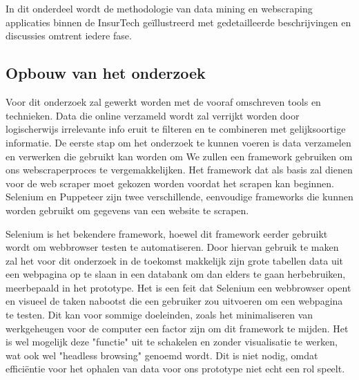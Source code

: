 
\chapter{}
\label{ch:methodologie}


In dit onderdeel wordt de methodologie van data mining en webscraping applicaties binnen de InsurTech geïllustreerd met gedetailleerde beschrijvingen en discussies omtrent iedere fase.

\section{Opbouw van het onderzoek}
Voor dit onderzoek zal gewerkt worden met de vooraf omschreven tools en technieken.
Data die online verzameld wordt zal verrijkt worden door logischerwijs irrelevante info eruit te filteren en te combineren met gelijksoortige informatie.
De eerste stap om het onderzoek te kunnen voeren is data verzamelen en verwerken die gebruikt kan worden om 
We zullen een framework gebruiken om ons webscraperproces te vergemakkelijken. Het framework dat als basis zal dienen voor de web scraper moet gekozen worden voordat het scrapen kan beginnen. Selenium en Puppeteer zijn twee verschillende, eenvoudige frameworks die kunnen worden gebruikt om gegevens van een website te scrapen.

Selenium is het bekendere framework, hoewel dit framework eerder gebruikt wordt om webbrowser testen te automatiseren. Door hiervan gebruik te maken zal het voor dit onderzoek in de toekomst makkelijk zijn grote tabellen data uit een webpagina op te slaan in een databank om dan elders te gaan herbebruiken, meerbepaald in het prototype. Het is een feit dat Selenium een webbrowser opent en visueel de taken nabootst die een gebruiker zou uitvoeren om een webpagina te testen. Dit kan voor sommige doeleinden, zoals het minimaliseren van werkgeheugen voor de computer een factor zijn om dit framework te mijden. Het is wel mogelijk deze "functie" uit te schakelen en zonder visualisatie te werken, wat ook wel "headless browsing" genoemd wordt. Dit is niet nodig, omdat efficiëntie voor het ophalen van data voor ons prototype niet echt een rol speelt. 

